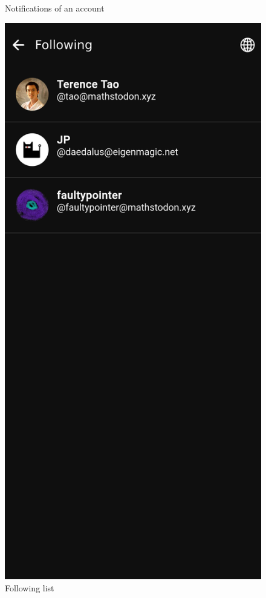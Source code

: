 \begin{figure}[htbp]
\begin{minipage}[b]{0.45\linewidth}
    \caption{Notifications of an account}
    \label{fig:notifications}
  \end{minipage}
  \hfill %
  \begin{minipage}[b]{0.45\linewidth}
    \centering
    \includegraphics[width=\linewidth]{Graphics/followerandfollowing.png}
    \caption{Following list}
    \label{fig:following_list}
  \end{minipage}
\end{figure}

